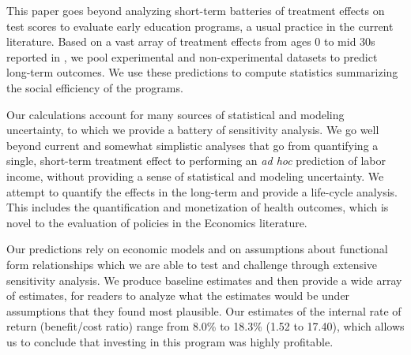 This paper goes beyond analyzing short-term batteries of treatment effects on test scores to evaluate early education programs, a usual practice in the current literature. Based on a vast array of treatment effects from ages 0 to mid 30s reported in \citet{Garcia_Heckman_Ziff_2017_Gender-Diff_UNPUBLISHED}, we pool experimental and non-experimental datasets to predict long-term outcomes. We use these predictions to compute statistics summarizing the social efficiency of the programs. 

Our calculations account for many sources of statistical and modeling uncertainty, to which we provide a battery of sensitivity analysis. We go well beyond current and somewhat simplistic analyses that go from quantifying a single, short-term treatment effect to performing an \textit{ad hoc} prediction of labor income, without providing a sense of statistical and modeling uncertainty. We attempt to quantify the effects in the long-term and provide a life-cycle analysis. This includes the quantification and monetization of health outcomes, which is novel to the evaluation of policies in the Economics literature.

Our predictions rely on economic models and on assumptions about functional form relationships which we are able to test and challenge through extensive sensitivity analysis. We produce baseline estimates and then provide a wide array of estimates, for readers to analyze what the estimates would be under assumptions that they found most plausible. Our estimates of the internal rate of return (benefit/cost ratio) range from 8.0\% to 18.3\% (1.52 to 17.40), which allows us to conclude that investing in this program was highly profitable. 

\clearpage

\singlespace



 